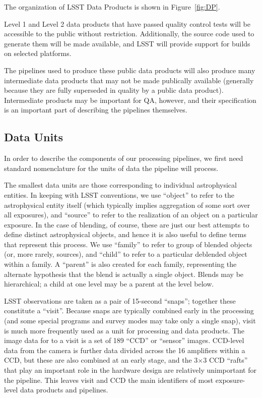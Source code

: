 The organization of LSST Data Products is shown in Figure~\ref{fig:DP}.

Level 1 and Level 2 data products that have passed quality control
tests will be accessible to the public without restriction.
Additionally, the source code used to generate them will be made
available, and LSST will provide support for builds on selected
platforms.

The pipelines used to produce these public data products will also produce many intermediate data products that may not be made publically available (generally because they are fully superseded in quality by a public data product).  Intermediate products may be important for QA, however, and their specification is an important part of describing the pipelines themselves.

\subsection{Data Units}
\label{sec:introDataUnits}

In order to describe the components of our processing pipelines, we first need standard nomenclature for the units of data the pipeline will process.

The smallest data units are those corresponding to individual astrophysical entities.  In keeping with LSST conventions, we use ``object'' to refer to the astrophysical entity itself (which typically implies aggregation of some sort over all exposures), and ``source'' to refer to the realization of an object on a particular exposure.  In the case of blending, of course, these are just our best attempts to define distinct astrophysical objects, and hence it is also useful to define terms that represent this process.  We use ``family'' to refer to group of blended objects (or, more rarely, sources), and ``child'' to refer to a particular deblended object within a family.  A ``parent'' is also created for each family, representing the alternate hypothesis that the blend is actually a single object.  Blends may be hierarchical; a child at one level may be a parent at the level below.

LSST observations are taken as a pair of 15-second ``snaps''; together these constitute a ``visit''.  Because snaps are typically combined early in the processing (and some special programs and survey modes may take only a single snap), visit is much more frequently used as a unit for processing and data products.  The image data for to a visit is a set of 189 ``CCD'' or ``sensor'' images.  CCD-level data from the camera is further data divided across the 16 amplifiers within a CCD, but these are also combined at an early stage, and the 3$\times$3 CCD ``rafts'' that play an important role in the hardware design are relatively unimportant for the pipeline.  This leaves visit and CCD the main identifiers of most exposure-level data products and pipelines.

